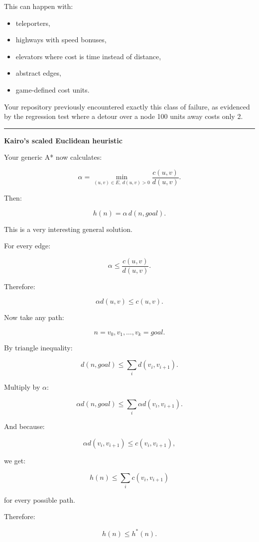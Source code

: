 This can happen with:

\begin{itemize}
\tightlist
\item
  teleporters,
\item
  highways with speed bonuses,
\item
  elevators where cost is time instead of distance,
\item
  abstract edges,
\item
  game-defined cost units.
\end{itemize}

Your repository previously encountered exactly this class of failure, as evidenced by the regression test where a detour over a node 100 units away costs only 2.

\begin{center}\rule{0.5\linewidth}{0.5pt}\end{center}

\textbf{Kairo's scaled Euclidean heuristic}

Your generic A* now calculates:

\[
\alpha=
\min_{(u,v)\in E,\ d(u,v)>0}
\frac{c(u,v)}{d(u,v)}.
\]

Then:

\[
\boxed{
h(n)=
\alpha\,d(n,goal).
}
\]

This is a very interesting general solution.

For every edge:

\[
\alpha
\le
\frac{c(u,v)}{d(u,v)}.
\]

Therefore:

\[
\alpha d(u,v)
\le
c(u,v).
\]

Now take any path:

\[
n=v_0,v_1,\dots,v_k=goal.
\]

By triangle inequality:

\[
d(n,goal)
\le
\sum_i d(v_i,v_{i+1}).
\]

Multiply by \(\alpha\):

\[
\alpha d(n,goal)
\le
\sum_i
\alpha d(v_i,v_{i+1}).
\]

And because:

\[
\alpha d(v_i,v_{i+1})
\le
c(v_i,v_{i+1}),
\]

we get:

\[
\boxed{
h(n)
\le
\sum_i c(v_i,v_{i+1})
}
\]

for every possible path.

Therefore:

\[
h(n)\le h^*(n).
\]

